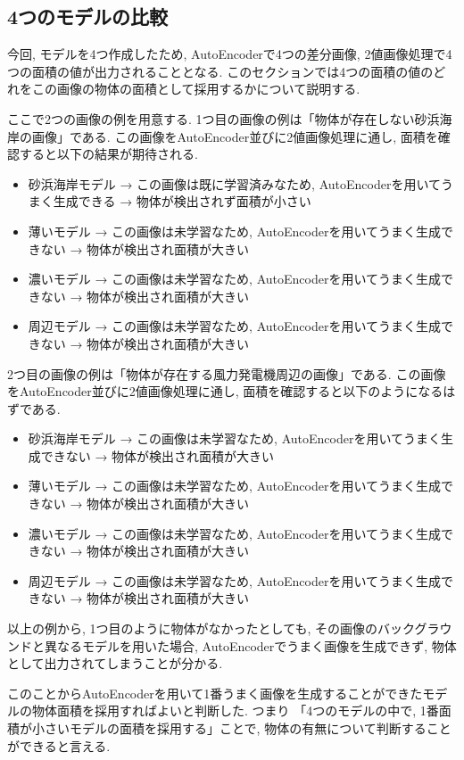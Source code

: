 \documentclass[dvipdfmx]{jsarticle}
\begin{document}
\subsection{4つのモデルの比較}
今回, モデルを4つ作成したため, AutoEncoderで4つの差分画像, 2値画像処理で4つの面積の値が出力されることとなる.
このセクションでは4つの面積の値のどれをこの画像の物体の面積として採用するかについて説明する.

ここで2つの画像の例を用意する.
1つ目の画像の例は「物体が存在しない砂浜海岸の画像」である.
この画像をAutoEncoder並びに2値画像処理に通し, 面積を確認すると以下の結果が期待される.
\begin{itemize}
    \item 砂浜海岸モデル → この画像は既に学習済みなため, AutoEncoderを用いてうまく生成できる → 物体が検出されず面積が小さい
    \item 薄いモデル → この画像は未学習なため, AutoEncoderを用いてうまく生成できない → 物体が検出され面積が大きい
    \item 濃いモデル → この画像は未学習なため, AutoEncoderを用いてうまく生成できない → 物体が検出され面積が大きい
    \item 周辺モデル → この画像は未学習なため, AutoEncoderを用いてうまく生成できない → 物体が検出され面積が大きい
\end{itemize}
2つ目の画像の例は「物体が存在する風力発電機周辺の画像」である.
この画像をAutoEncoder並びに2値画像処理に通し, 面積を確認すると以下のようになるはずである.
\begin{itemize}
    \item 砂浜海岸モデル → この画像は未学習なため, AutoEncoderを用いてうまく生成できない → 物体が検出され面積が大きい
    \item 薄いモデル → この画像は未学習なため, AutoEncoderを用いてうまく生成できない → 物体が検出され面積が大きい
    \item 濃いモデル → この画像は未学習なため, AutoEncoderを用いてうまく生成できない → 物体が検出され面積が大きい
    \item 周辺モデル → この画像は未学習なため, AutoEncoderを用いてうまく生成できない → 物体が検出され面積が大きい
\end{itemize}

以上の例から, 1つ目のように物体がなかったとしても, その画像のバックグラウンドと異なるモデルを用いた場合, AutoEncoderでうまく画像を生成できず, 物体として出力されてしまうことが分かる.

このことからAutoEncoderを用いて1番うまく画像を生成することができたモデルの物体面積を採用すればよいと判断した. つまり
「4つのモデルの中で, 1番面積が小さいモデルの面積を採用する」ことで, 物体の有無について判断することができると言える.
\end{document}
